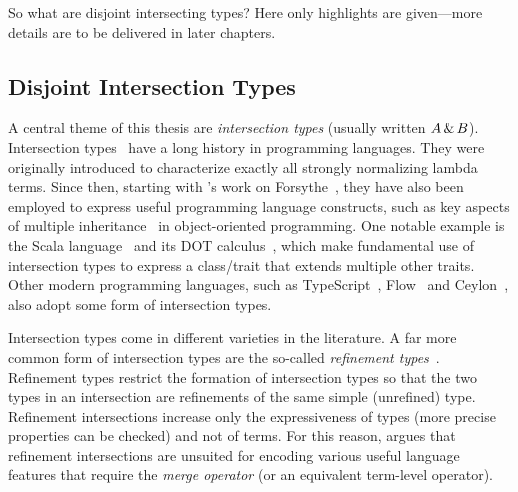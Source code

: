 So what are disjoint intersecting types? Here only highlights are given---more
details are to be delivered in later chapters.

\subsection{Disjoint Intersection Types}

A central theme of this thesis are \emph{intersection types} (usually written
$A \,\&\, B$). Intersection types~\citep{pottinger1980type, coppoInter} have a
long history in programming languages. They were originally introduced to
characterize exactly all strongly normalizing lambda terms. Since then, starting
with \citeauthor{reynolds1988preliminary}'s work on
Forsythe~\citep{reynolds1988preliminary}, they have also been employed to
express useful programming language constructs, such as key aspects of multiple
inheritance~\citep{compagnoni1996higher} in object-oriented programming. One
notable example is the Scala language~\citep{odersky2004overview} and its DOT
calculus~\citep{amin2012dependent}, which make fundamental use of intersection
types to express a class/trait that extends multiple other traits. Other modern
programming languages, such as TypeScript~\citep{typescript}, Flow~\citep{flow}
and Ceylon~\citep{ceylon}, also adopt some form of intersection types.

Intersection types come in different varieties in the literature. A far more
common form of intersection types are the so-called \emph{refinement types}~\citep{Freeman_1991, Davies_2000, dunfield2003type}. Refinement types
restrict the formation of intersection types so that the two types in an
intersection are refinements of the same simple (unrefined) type.
Refinement intersections increase only the expressiveness of types (more precise
properties can be checked) and not of terms. For this reason,
\citet{dunfield2014elaborating} argues that refinement intersections are unsuited
for encoding various useful language features that require the \emph{merge operator}
(or an equivalent term-level operator).

